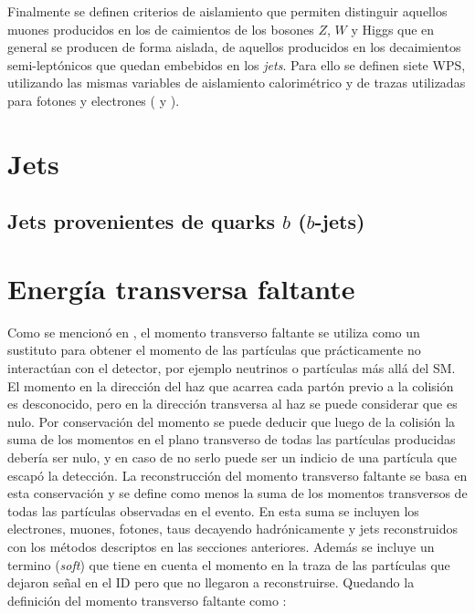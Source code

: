 Finalmente se definen criterios de aislamiento que permiten distinguir aquellos muones producidos en los de caimientos de los bosones $Z$, $W$ y Higgs que en general se producen de forma aislada, de aquellos producidos en los decaimientos semi-leptónicos que quedan embebidos en los \textit{jets}. Para ello se definen siete WPS, utilizando las mismas variables de aislamiento calorimétrico y de trazas utilizadas para fotones y electrones ( y ).


\section{Jets}





\subsection{Jets provenientes de quarks $b$ ($b$-jets)}







\section{Energía transversa faltante}


Como se mencionó en , el momento transverso faltante se utiliza como un sustituto  para obtener el momento de las partículas que prácticamente no interactúan con el detector, por ejemplo neutrinos o partículas más allá del SM. El momento en la dirección del haz que acarrea cada partón  previo a la colisión es desconocido, pero en la dirección transversa al haz se puede considerar que es nulo. Por conservación del momento se puede deducir que luego de la colisión la suma de los momentos en el plano transverso de todas las partículas producidas debería ser nulo, y en caso de no serlo puede ser un indicio de una partícula que escapó la detección. La reconstrucción del momento transverso faltante se basa en esta conservación y se define como menos la suma de los momentos transversos de todas las partículas observadas en el evento. En esta suma se incluyen los electrones, muones, fotones, taus decayendo hadrónicamente y jets reconstruidos con los métodos descriptos en las secciones anteriores. Además se incluye un termino (\textit{soft}) que tiene en cuenta el momento en la traza de las partículas que dejaron señal en el ID pero que no llegaron a reconstruirse. Quedando la definición del momento transverso faltante como \cite{PERF-2016-07}:

